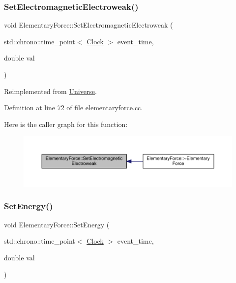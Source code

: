 \subsubsection{\texorpdfstring{Set\+Electromagnetic\+Electroweak()}{SetElectromagneticElectroweak()}}
{\footnotesize\ttfamily void Elementary\+Force\+::\+Set\+Electromagnetic\+Electroweak (\begin{DoxyParamCaption}\item[{std\+::chrono\+::time\+\_\+point$<$ \hyperlink{universe_8h_a0ef8d951d1ca5ab3cfaf7ab4c7a6fd80}{Clock} $>$}]{event\+\_\+time,  }\item[{double}]{val }\end{DoxyParamCaption})\hspace{0.3cm}{\ttfamily [virtual]}}



Reimplemented from \hyperlink{class_universe_a608aa95698380f791a0ffba45cc1bee3}{Universe}.



Definition at line 72 of file elementaryforce.\+cc.

Here is the caller graph for this function\+:
\nopagebreak
\begin{figure}[H]
\begin{center}
\leavevmode
\includegraphics[width=350pt]{class_elementary_force_af4f12038c33d7edf9f13339fcd632ec9_icgraph}
\end{center}
\end{figure}
\mbox{\label{class_elementary_force_a466c84ee4a50a29ef1f0fc6509ae3161}} 
\subsubsection{\texorpdfstring{Set\+Energy()}{SetEnergy()}}
{\footnotesize\ttfamily void Elementary\+Force\+::\+Set\+Energy (\begin{DoxyParamCaption}\item[{std\+::chrono\+::time\+\_\+point$<$ \hyperlink{universe_8h_a0ef8d951d1ca5ab3cfaf7ab4c7a6fd80}{Clock} $>$}]{event\+\_\+time,  }\item[{double}]{val }\end{DoxyParamCaption})}


